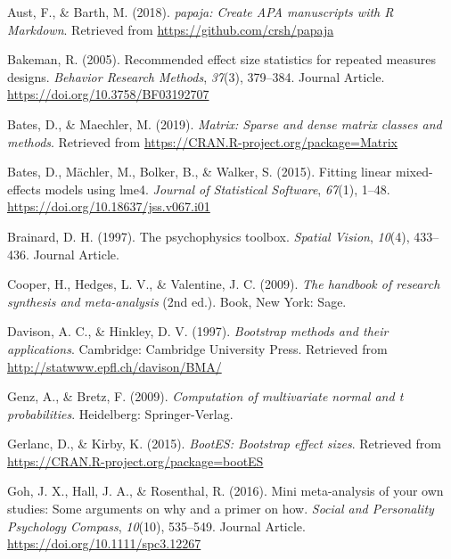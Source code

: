 \documentclass[man]{apa6}
\begin{document}
\begingroup
\setlength{\parindent}{-0.5in}
\setlength{\leftskip}{0.5in}

\hypertarget{refs}{}
\leavevmode\hypertarget{ref-R-papaja}{}%
Aust, F., \& Barth, M. (2018). \emph{papaja: Create APA manuscripts with R Markdown}. Retrieved from \url{https://github.com/crsh/papaja}

\leavevmode\hypertarget{ref-Bakeman_2015_eff_size}{}%
Bakeman, R. (2005). Recommended effect size statistics for repeated measures designs. \emph{Behavior Research Methods}, \emph{37}(3), 379--384. Journal Article. \url{https://doi.org/10.3758/BF03192707}

\leavevmode\hypertarget{ref-R-Matrix}{}%
Bates, D., \& Maechler, M. (2019). \emph{Matrix: Sparse and dense matrix classes and methods}. Retrieved from \url{https://CRAN.R-project.org/package=Matrix}

\leavevmode\hypertarget{ref-R-lme4}{}%
Bates, D., Mächler, M., Bolker, B., \& Walker, S. (2015). Fitting linear mixed-effects models using lme4. \emph{Journal of Statistical Software}, \emph{67}(1), 1--48. \url{https://doi.org/10.18637/jss.v067.i01}

\leavevmode\hypertarget{ref-Brainard_1997}{}%
Brainard, D. H. (1997). The psychophysics toolbox. \emph{Spatial Vision}, \emph{10}(4), 433--436. Journal Article.

\leavevmode\hypertarget{ref-Cooper_2009_handbook}{}%
Cooper, H., Hedges, L. V., \& Valentine, J. C. (2009). \emph{The handbook of research synthesis and meta-analysis} (2nd ed.). Book, New York: Sage.

\leavevmode\hypertarget{ref-R-boot}{}%
Davison, A. C., \& Hinkley, D. V. (1997). \emph{Bootstrap methods and their applications}. Cambridge: Cambridge University Press. Retrieved from \url{http://statwww.epfl.ch/davison/BMA/}

\leavevmode\hypertarget{ref-R-mvtnorm}{}%
Genz, A., \& Bretz, F. (2009). \emph{Computation of multivariate normal and t probabilities}. Heidelberg: Springer-Verlag.

\leavevmode\hypertarget{ref-R-bootES}{}%
Gerlanc, D., \& Kirby, K. (2015). \emph{BootES: Bootstrap effect sizes}. Retrieved from \url{https://CRAN.R-project.org/package=bootES}

\leavevmode\hypertarget{ref-Goh_2016_mini}{}%
Goh, J. X., Hall, J. A., \& Rosenthal, R. (2016). Mini meta-analysis of your own studies: Some arguments on why and a primer on how. \emph{Social and Personality Psychology Compass}, \emph{10}(10), 535--549. Journal Article. \url{https://doi.org/10.1111/spc3.12267}
\end{document}
